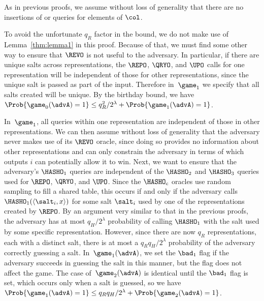 As in previous proofs, we assume without loss of generality that there are no insertions of or queries for elements of $\col$.

To avoid the unfortunate $q_R$ factor in the bound, we do not make use of Lemma~\ref{thm:lemma1} in this proof. Because of that, we must find some other way to ensure that $\REVO$ is not useful to the adversary. In particular, if there are unique salts across representations, the $\REPO$, $\QRYO$, and $\UPO$ calls for one representation will be independent of those for other representations, since the unique salt is passed as part of the input. Therefore in~$\game_1$ we specify that all salts created will be unique. By the birthday bound, we have $\Prob{\game_0(\advA) = 1} \le q_R^2/2^\lambda + \Prob{\game_1(\advA) = 1}$.

In~$\game_1$, all queries within one representation are independent of those in other representations. We can then assume without loss of generality that the adversary never makes use of its $\REVO$ oracle, since doing so provides no information about other representations and can only constrain the adversary in terms of which outputs $i$ can potentially allow it to win. Next, we want to ensure that the adversary's $\HASHO_1$ queries are independent of the $\HASHO_2$ and $\HASHO_3$ queries used for $\REPO$, $\QRYO$, and $\UPO$. Since the $\HASHO_c$ oracles use random sampling to fill a shared table, this occurs if and only if the adversary calls $\HASHO_1(\langle\salt_i,x\rangle)$ for some salt $\salt_i$ used by one of the representations created by $\REPO$. By an argument very similar to that in the previous proofs, the adversary has at most $q_H/2^\lambda$ probability of calling $\HASHO_1$ with the salt used by some specific representation. However, since there are now $q_R$ representations, each with a distinct salt, there is at most a $q_Rq_H/2^\lambda$ probability of the adversary correctly guessing a salt. In~$\game_1(\advA)$, we set the $\bad_1$ flag if the adversary succeeds in guessing the salt in this manner, but the flag does not affect the game. The case of~$\game_2(\advA)$ is identical until the $\bad_1$ flag is set, which occurs only when a salt is guessed, so we have $\Prob{\game_1(\advA) = 1} \le q_Rq_H/2^\lambda + \Prob{\game_2(\advA) = 1}$.

